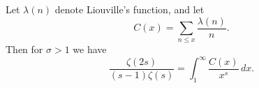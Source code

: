 Let $\lambda(n)$ denote Liouville's function, and let
$$
C(x) = \sum_{n \leq x} \frac{\lambda(n)}{n}.
$$
Then for $\sigma > 1$ we have
$$
\frac{\zeta(2s)}{(s-1)\zeta(s)} = \int_1^\infty \frac{C(x)}{x^s} \, dx.
$$
